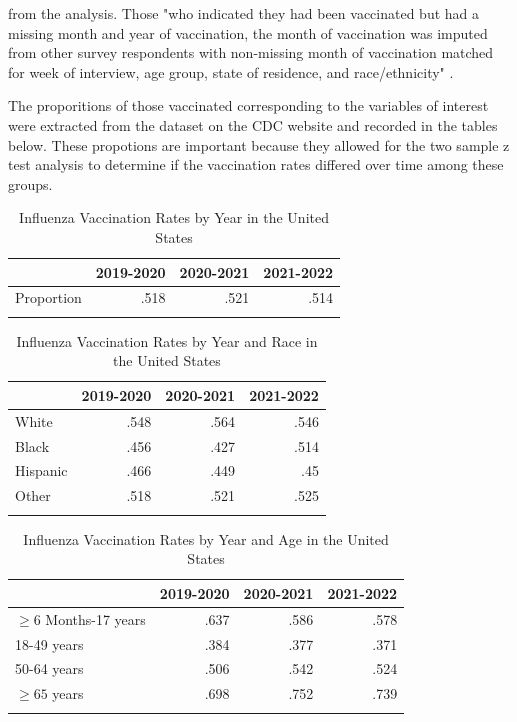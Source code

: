\documentclass[12pt]{article}
\begin{document}
from the analysis. Those "who indicated they had been vaccinated but had a missing month and year of vaccination, the month of vaccination was imputed from other survey respondents with non-missing
month of vaccination matched for week of interview, age group, state of residence, and race/ethnicity" \citep{cdc_2021}. \par
The proporitions of those vaccinated corresponding to the variables of interest were extracted from the dataset on the CDC website and recorded in the tables below. These propotions are important
because they allowed for the two sample z test analysis to determine if the vaccination rates differed over time among these groups.\par
\pagebreak
\begin{table}[h!]
    \centering
    \caption{Influenza Vaccination Rates by Year in the United States}
    \label{tab:table:proporitonsyear}
     \begin{tabularx}{.8\textwidth}{X rrr}
      \lsptoprule
                & 2019-2020 & 2020-2021  & 2021-2022\\
      \midrule
      Proportion  &   .518  &    .521  &    .514\\
      \lspbottomrule
     \end{tabularx}
    \end{table}

\begin{table}[h!]
    \centering
    \caption{Influenza Vaccination Rates by Year and Race in the United States}
    \label{tab:table:proporitonsrace}
     \begin{tabularx}{.8\textwidth}{X rrr}
      \lsptoprule
                & 2019-2020 & 2020-2021  & 2021-2022\\
      \midrule
      White  &   .548  &    .564  &    .546\\
      Black  &   .456  &    .427  &    .514\\
      Hispanic  &   .466  &    .449  &   .45\\
      Other  &   .518  &    .521  &    .525\\
      \lspbottomrule
     \end{tabularx}
    \end{table}

\begin{table}[h!]
    \centering
    \caption{Influenza Vaccination Rates by Year and Age in the United States}
    \label{tab:table:proporitonsage}
     \begin{tabularx}{.8\textwidth}{X rrr}
      \lsptoprule
                & 2019-2020 & 2020-2021  & 2021-2022\\
      \midrule
      $\ge6$ Months-17 years  &   .637  &    .586  &    .578\\
      18-49 years  &   .384  &    .377  &    .371\\
      50-64 years &   .506  &    .542  &    .524\\
      $\ge 65$ years  &   .698  &    .752 &   .739\\
      \lspbottomrule
     \end{tabularx}
    \end{table}
\end{document}
